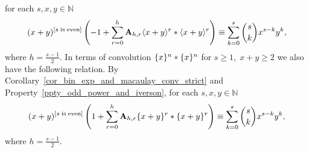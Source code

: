 \documentclass[12pt,letterpaper,oneside,reqno]{amsart}
\newcommand \anglePower [2]{\langle #1 \rangle \sp{#2}}
\newcommand \curvePower [2]{\{#1\}\sp{#2}}
\newcommand \iversonBracket [1][s]{[#1 \; \mathrm{is} \; \mathrm{even}]}
\newcommand \coeffA [3][A] {{\mathbf{#1}} \sb{#2,#3}}
\numberwithin{equation}{section}
\begin{document}
    for each $s,x,y \in \mathbb{N}$
    \begin{equation*}
        (x+y)^{\iversonBracket} \left(-1 + \sum_{r=0}^{h} \coeffA{h}{r} \anglePower{x+y}{r} \ast \anglePower{x+y}{r} \right)
        \equiv
        \sum_{k=0}^{s} \binom{s}{k} x^{s-k} y^k,
    \end{equation*}
    where $h=\frac{s-1}{2}$.
    In terms of convolution $\curvePower{x}{n} \ast \curvePower{x}{n}$ for $s\geq 1, \; x+y\geq 2$ we also have
    the following relation.
    By Corollary~\ref{cor_bin_exp_and_macaulay_conv_strict} and Property~\ref{ppty_odd_power_and_iverson},
    for each $s,x,y\in\mathbb{N}$
    \begin{equation*}
        (x+y)^{\iversonBracket} \left(1 + \sum_{r=0}^{h} \coeffA{h}{r} \curvePower{x+y}{r} \ast \curvePower{x+y}{r} \right)
        \equiv
        \sum_{k=0}^{s} \binom{s}{k} x^{s-k} y^k,
    \end{equation*}
    where $h=\frac{s-1}{2}$.
\end{document}
